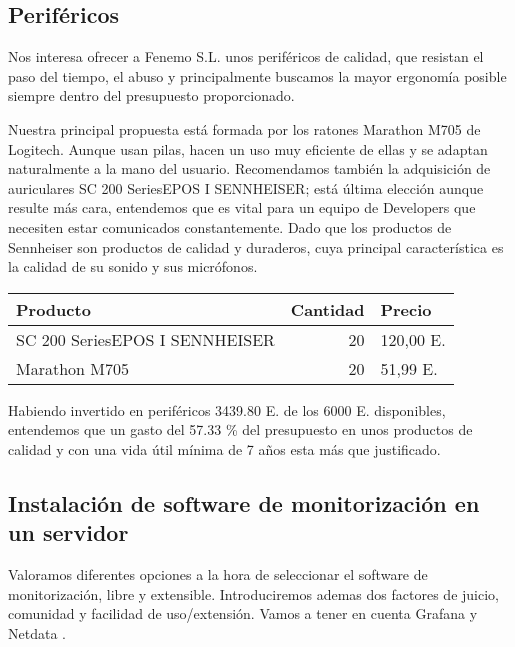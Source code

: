 \documentclass[11pt]{article}
\begin{document}
\subsection{Periféricos}
\label{sec:orgdd71891}

Nos interesa ofrecer a Fenemo S.L. unos periféricos de calidad, que resistan el paso del tiempo, el abuso y principalmente buscamos la mayor ergonomía posible siempre dentro del presupuesto proporcionado.

Nuestra principal propuesta está formada por los ratones Marathon M705 de Logitech. Aunque usan pilas, hacen un uso muy eficiente de ellas y se adaptan naturalmente a la mano del usuario. Recomendamos también la adquisición de auriculares SC 200 SeriesEPOS I SENNHEISER; está última elección aunque resulte más cara, entendemos que es vital para un equipo de Developers que necesiten estar comunicados constantemente. Dado que los productos de Sennheiser son productos de calidad y duraderos, cuya principal característica es la calidad de su sonido y sus micrófonos.

\begin{center}
\begin{tabular}{lrl}
Producto & Cantidad & Precio\\
\hline
SC 200 SeriesEPOS I SENNHEISER & 20 & 120,00 E.\\
Marathon M705 & 20 & 51,99  E.\\
\end{tabular}
\end{center}

Habiendo invertido en periféricos 3439.80 E. de los 6000 E. disponibles, entendemos que un gasto del 57.33 \% del presupuesto en unos productos de calidad y con una vida útil mínima de 7 años esta más que justificado.

\subsection{Instalación de software de monitorización en un servidor}
\label{sec:orgbac7d80}

Valoramos diferentes opciones a la hora de seleccionar el software de monitorización, libre y extensible. Introduciremos ademas dos factores de juicio, comunidad y facilidad de uso/extensión. Vamos a tener en cuenta Grafana \cite{grafanagit2020} y Netdata \cite{netdatagit2020}.
\end{document}
